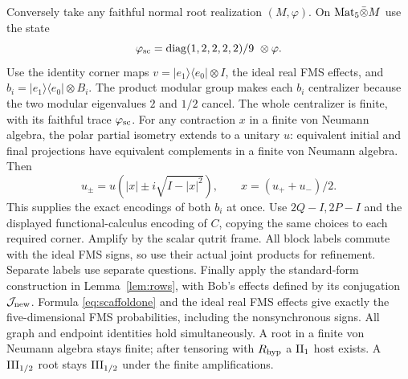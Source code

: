 Conversely take any faithful normal root realization $(M,\varphi)$. On $\mathrm{Mat}_5\bar\otimes M$ use the state
\begin{equation}\label{eq:scaffoldone}
 \varphi_{\rm sc}=\operatorname{diag}(1,2,2,2,2)/9\ \otimes\varphi.
\end{equation}
Use the identity corner maps $v=|e_1\rangle\langle e_0|\otimes I$, the ideal real FMS effects, and $b_i=|e_1\rangle\langle e_0|\otimes B_i$. The product modular group makes each $b_i$ centralizer because the two modular eigenvalues $2$ and $1/2$ cancel. The whole centralizer is finite, with its faithful trace $\varphi_{\rm sc}$. For any contraction $x$ in a finite von Neumann algebra, the polar partial isometry extends to a unitary $u$: equivalent initial and final projections have equivalent complements in a finite von Neumann algebra. Then
\[
 u_\pm=u(|x|\pm i\sqrt{I-|x|^2}),\qquad x=(u_++u_-)/2.
\]
This supplies the exact encodings of both $b_i$ at once. Use $2Q-I,2P-I$ and the displayed functional-calculus encoding of $C$, copying the same choices to each required corner. Amplify by the scalar qutrit frame. All block labels commute with the ideal FMS signs, so use their actual joint products for refinement. Separate labels use separate questions. Finally apply the standard-form construction in Lemma~\ref{lem:rows}, with Bob's effects defined by its conjugation $\mathcal J_{\rm new}$. Formula \eqref{eq:scaffoldone} and the ideal real FMS effects give exactly the five-dimensional FMS probabilities, including the nonsynchronous signs. All graph and endpoint identities hold simultaneously. A root in a finite von Neumann algebra stays finite; after tensoring with $R_{\rm hyp}$ a $\mathrm{II}_1$ host exists. A $\mathrm{III}_{1/2}$ root stays $\mathrm{III}_{1/2}$ under the finite amplifications.

